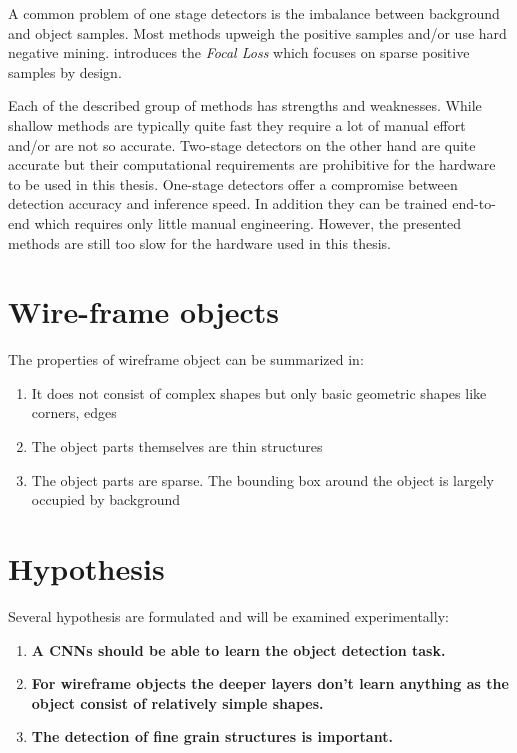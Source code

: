 	A common problem of one stage detectors is the imbalance between background and object samples. Most methods upweigh the positive samples and/or use hard negative mining. \cite{Lin} introduces the \textit{Focal Loss} which focuses on sparse positive samples by design.
	
	Each of the described group of methods has strengths and weaknesses. While shallow methods are typically quite fast they require a lot of manual effort and/or are not so accurate. Two-stage detectors on the other hand are quite accurate but their computational requirements are prohibitive for the hardware to be used in this thesis. One-stage detectors offer a compromise between detection accuracy and inference speed. In addition they can be trained end-to-end which requires only little manual engineering. However, the presented methods are still too slow for the hardware used in this thesis.






\section{Wire-frame objects}


The properties of wireframe object can be summarized in:
\begin{enumerate}
	\item It does not consist of complex shapes but only basic geometric shapes like corners, edges
	\item The object parts themselves are thin structures
	\item The object parts are sparse. The bounding box around the object is largely occupied by background
\end{enumerate}


\section{Hypothesis}

Several hypothesis are formulated and will be examined experimentally:
\begin{enumerate}
	\item \textbf{A \acp{CNN} should be able to learn the object detection task.}
	\item \textbf{For wireframe objects the deeper layers don't learn anything as the object consist of relatively simple shapes.}
	\item \textbf{The detection of fine grain structures is important.}
\end{enumerate}
\newpage
